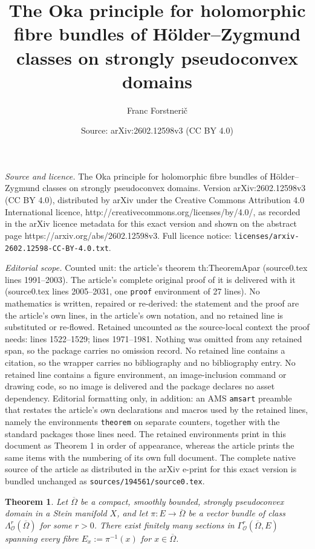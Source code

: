 \documentclass[10pt,a4paper]{amsart}
\title{The Oka principle for holomorphic fibre bundles of H\"older--Zygmund classes on strongly pseudoconvex domains}
\author{Franc Forstneri{\v c}}
\date{Source: arXiv:2602.12598v3 (CC BY 4.0)}
\newtheorem{theorem}{Theorem}
\newcommand\Oscr{\mathscr{O}}
\begin{document}
\maketitle

\noindent\emph{Source and licence.} The Oka principle for holomorphic fibre bundles of H\"older--Zygmund classes on strongly pseudoconvex domains. Version arXiv:2602.12598v3 (CC BY 4.0), distributed by arXiv under the Creative Commons Attribution 4.0 International licence, http://creativecommons.org/licenses/by/4.0/, as recorded in the arXiv licence metadata for this exact version and shown on the abstract page https://arxiv.org/abs/2602.12598v3. Full licence notice: \texttt{licenses/arxiv-2602.12598-CC-BY-4.0.txt}.\par\smallskip

\noindent\textit{Editorial scope.} Counted unit: the article's theorem th:TheoremApar (source0.tex lines 1991--2003). The article's complete original proof of it is delivered with it (source0.tex lines 2005--2031, one \texttt{proof} environment of 27 lines). No mathematics is written, repaired or re-derived: the statement and the proof are the article's own lines, in the article's own notation, and no retained line is substituted or re-flowed.  Retained uncounted as the source-local context the proof needs: lines 1522--1529; lines 1971--1981.  Nothing was omitted from any retained span, so the package carries no omission record.  No retained line contains a citation, so the wrapper carries no bibliography and no bibliography entry.  No retained line contains a figure environment, an image-inclusion command or drawing code, so no image is delivered and the package declares no asset dependency.  Editorial formatting only, in addition: an AMS \texttt{amsart} preamble that restates the article's own declarations and macros used by the retained lines, namely the environments \texttt{theorem} on separate counters, together with the standard packages those lines need.  The retained environments print in this document as Theorem 1 in order of appearance, whereas the article prints the same items with the numbering of its own full document.  The complete native source of the article as distributed in the arXiv e-print for this exact version is bundled unchanged as \texttt{sources/194561/source0.tex}.
\begin{theorem}\label{th:TheoremA}
Let $\overline \Omega$ be a compact, smoothly bounded, 
strongly pseudoconvex domain in a Stein manifold $X$,  
and let $\pi:E\to \overline \Omega$ be a vector bundle 
of class $\Lambda^r_\Oscr(\overline\Omega)$ for some $r>0$. 
There exist finitely many sections in $\Gamma^r_\Oscr(\overline\Omega,E)$ 
spanning every fibre $E_x:=\pi^{-1}(x)$ for $x\in \overline \Omega$.
\end{theorem}
\end{document}
